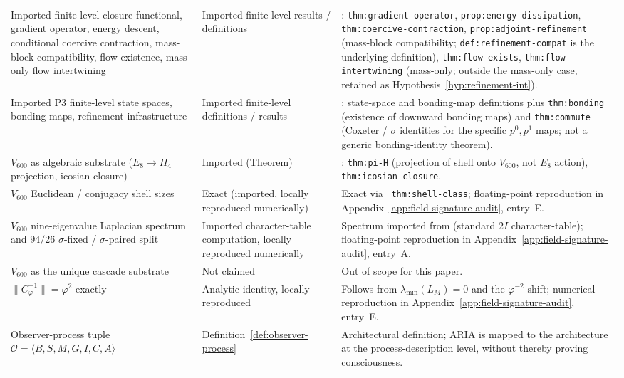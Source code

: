 \documentclass[11pt]{article}
\theoremstyle{definition}
\newcommand{\pphi}{\varphi}
\newcommand{\Ocal}{\mathcal{O}}
\newcommand{\Vsub}{V_{600}}
\newcommand{\Cphi}{C_{\pphi}}
\begin{document}
\begin{longtable}{>{\raggedright\arraybackslash}p{}>{\raggedright\arraybackslash}p{}>{\raggedright\arraybackslash}p{}}
Imported finite-level closure functional, gradient operator, energy descent, conditional coercive contraction, mass-block compatibility, flow existence, mass-only flow intertwining
& Imported finite-level results / definitions
& \cite{CascadeClosureDynamics}: \texttt{thm:gradient-operator}, \texttt{prop:energy-dissipation}, \texttt{thm:coercive-contraction}, \texttt{prop:adjoint-refinement} (mass-block compatibility; \texttt{def:refinement-compat} is the underlying definition), \texttt{thm:flow-exists}, \texttt{thm:flow-intertwining} (mass-only; outside the mass-only case, retained as Hypothesis~\ref{hyp:refinement-int}). \\
Imported P3 finite-level state spaces, bonding maps, refinement infrastructure
& Imported finite-level definitions / results
& \cite{CascadeRefinementSpaces}: state-space and bonding-map definitions plus \texttt{thm:bonding} (existence of downward bonding maps) and \texttt{thm:commute} (Coxeter / $\sigma$ identities for the specific $p^0, p^1$ maps; not a generic bonding-identity theorem). \\
$\Vsub$ as algebraic substrate ($E_8 \to H_4$ projection, icosian closure)
& Imported (Theorem)
& \cite{CascadeAlgSubstrate}: \texttt{thm:pi-H} (projection of shell onto $\Vsub$, not $E_8$ action), \texttt{thm:icosian-closure}. \\
$\Vsub$ Euclidean / conjugacy shell sizes
& Exact (imported, locally reproduced numerically)
& Exact via \cite{CascadeAlgSubstrate}~\texttt{thm:shell-class}; floating-point reproduction in Appendix~\ref{app:field-signature-audit}, entry~E. \\
$\Vsub$ nine-eigenvalue Laplacian spectrum and $94/26$ $\sigma$-fixed / $\sigma$-paired split
& Imported character-table computation, locally reproduced numerically
& Spectrum imported from \cite{CascadeAlgSubstrate} (standard $2I$ character-table); floating-point reproduction in Appendix~\ref{app:field-signature-audit}, entry~A. \\
$\Vsub$ as the unique cascade substrate
& Not claimed
& Out of scope for this paper. \\
$\|\Cphi^{-1}\| = \pphi^2$ exactly
& Analytic identity, locally reproduced
& Follows from $\lambda_{\min}(L_M) = 0$ and the $\pphi^{-2}$ shift; numerical reproduction in Appendix~\ref{app:field-signature-audit}, entry~E. \\
Observer-process tuple $\Ocal = \langle B,S,M,G,I,C,A\rangle$
& Definition~\ref{def:observer-process}
& Architectural definition; ARIA is mapped to the architecture at the process-description level, without thereby proving consciousness. \\

\end{longtable}
\end{document}
